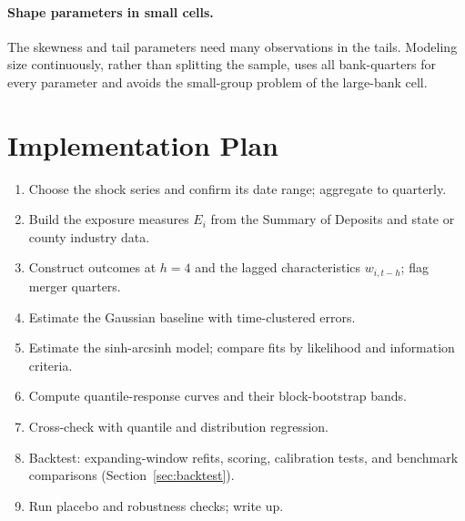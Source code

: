 \documentclass[11pt]{article}
\begin{document}
\paragraph{Shape parameters in small cells.} The skewness and tail parameters need many observations in the tails. Modeling size continuously, rather than splitting the sample, uses all bank-quarters for every parameter and avoids the small-group problem of the large-bank cell.

\section{Implementation Plan}

\begin{enumerate}
  \item Choose the shock series and confirm its date range; aggregate to quarterly.
  \item Build the exposure measures $E_i$ from the Summary of Deposits and state or county industry data.
  \item Construct outcomes at $h=4$ and the lagged characteristics $w_{i,t-h}$; flag merger quarters.
  \item Estimate the Gaussian baseline with time-clustered errors.
  \item Estimate the sinh-arcsinh model; compare fits by likelihood and information criteria.
  \item Compute quantile-response curves and their block-bootstrap bands.
  \item Cross-check with quantile and distribution regression.
  \item Backtest: expanding-window refits, scoring, calibration tests, and benchmark comparisons (Section~\ref{sec:backtest}).
  \item Run placebo and robustness checks; write up.
\end{enumerate}
\end{document}
